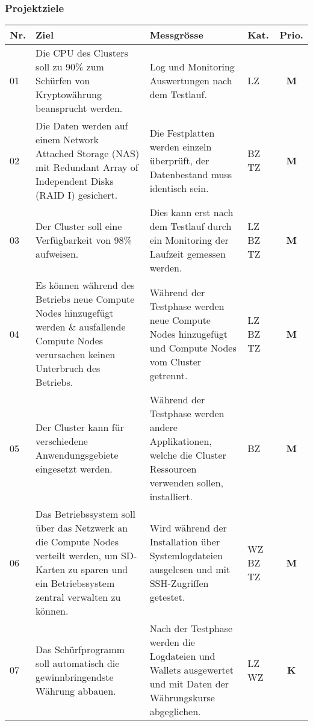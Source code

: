 \newpage
\subsubsection{Projektziele} 
\label{sec:Projektziele}

\begin{table}[H]
\begin{tabular}[t]{p{0.7cm}p{6.1cm}p{6.1cm} >{\centering}p{0.6cm}c}
\hline
\rowcolor{heading}\textbf{Nr.} & \textbf{Ziel} & \textbf{Messgrösse} & \textbf{Kat.} & \textbf{Prio.} \\\hline
01 & Die CPU des Clusters soll zu 90\% zum Schürfen von Kryptowährung  beansprucht werden. & Log und Monitoring Auswertungen nach dem Testlauf. & LZ & \textbf{M} \\\hline
02 & Die Daten werden auf einem Network Attached Storage (NAS) mit Redundant Array of Independent Disks (RAID I) gesichert. & Die Festplatten werden einzeln überprüft, der Datenbestand muss identisch sein. & BZ \newline TZ & \textbf{M} \\\hline
03 & Der Cluster soll eine Verfügbarkeit von 98\% aufweisen. & Dies kann erst nach dem Testlauf durch ein Monitoring der Laufzeit gemessen werden. & LZ \newline BZ \newline TZ & \textbf{M} \\\hline
04 & Es können während des Betriebs neue Compute Nodes hinzugefügt werden \& ausfallende Compute Nodes verursachen keinen Unterbruch des Betriebs. & Während der Testphase werden neue Compute Nodes hinzugefügt und Compute Nodes vom Cluster getrennt.  & LZ \newline BZ \newline TZ & \textbf{M} \\\hline 
05 & Der Cluster kann für verschiedene Anwendungsgebiete eingesetzt werden. & Während der Testphase werden andere Applikationen, welche die Cluster Ressourcen verwenden sollen, installiert. & BZ & \textbf{M} \\\hline
06 & Das Betriebssystem soll über das Netzwerk an die Compute Nodes verteilt werden, um SD-Karten zu sparen und ein Betriebssystem zentral verwalten zu können. & Wird während der Installation über Systemlogdateien ausgelesen und mit SSH-Zugriffen getestet. & WZ \newline BZ \newline TZ & \textbf{M} \\\hline
07 & Das Schürfprogramm soll automatisch die gewinnbringendste Währung abbauen. & Nach der Testphase werden die Logdateien und Wallets ausgewertet und mit Daten der Währungskurse abgeglichen. & LZ \newline WZ & \textbf{K} \\\hline

\end{tabular}
\end{table}
